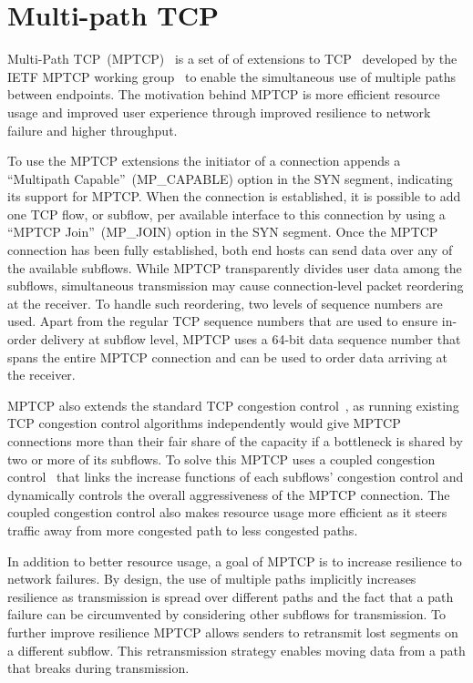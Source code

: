 \section{Multi-path TCP}
\label{sec:transports}
Multi-Path TCP~(MPTCP)~\cite{RFC6824} is a set of of extensions to
TCP~\cite{RFC793,RFC5681} developed by the IETF MPTCP working
group~\cite{MPTCPWG} to enable the simultaneous use of multiple paths between
endpoints. The motivation behind MPTCP is more efficient resource usage and
improved user experience through improved resilience to network failure and
higher throughput.

To use the MPTCP extensions the initiator of a connection appends a
``Multipath Capable''~(MP\_CAPABLE) option in the SYN segment, indicating its support for
MPTCP. When the connection is established, it is possible to add one
TCP flow, or subflow, per available interface to this connection by using a ``MPTCP Join''~(MP\_JOIN)
option in the SYN segment. Once the MPTCP connection has been fully established, both end hosts can
send data over any of the available subflows. While MPTCP transparently
divides user data among the subflows, simultaneous transmission may cause
connection-level packet reordering at the receiver. To handle such reordering,
two levels of sequence numbers are used. Apart from the regular TCP sequence
numbers that are used to ensure in-order delivery at subflow level, MPTCP uses a
64-bit data sequence number that spans the entire MPTCP connection and can be
used to order data arriving at the receiver.

MPTCP also extends the standard TCP congestion control~\cite{RFC2581}, as running existing TCP
congestion control algorithms independently would give MPTCP connections more
than their fair share of the capacity if a bottleneck is shared by two or more of its
subflows. To solve this MPTCP uses a coupled congestion control~\cite{rfc6356}
that links the increase functions of each subflows' congestion control and
dynamically controls the overall aggressiveness of the MPTCP connection. The
coupled congestion control also makes resource usage more efficient as it steers
traffic away from more congested path to less congested paths.

In addition to better resource usage, a goal of MPTCP is to increase
resilience to network failures. By design, the use of multiple paths implicitly
increases resilience as transmission is spread over different paths and the fact
that a path failure can be circumvented by considering other subflows for
transmission. To further improve resilience MPTCP allows senders to retransmit
lost segments on a different subflow. This retransmission strategy enables
moving data from a path that breaks during transmission.

